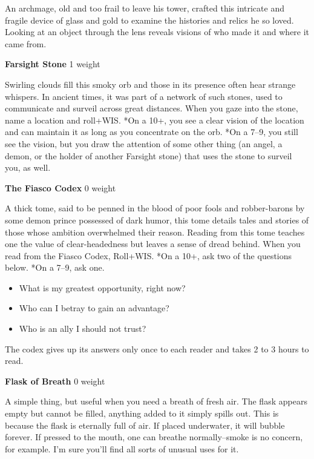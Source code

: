 An archmage, old and too frail to leave his tower, crafted this intricate and fragile device of glass and gold to examine the histories and relics he so loved. Looking at an object through the lens reveals visions of who made it and where it came from.

{\noindent \bfseries Farsight Stone} \hspace*{\fill} 1 weight

Swirling clouds fill this smoky orb and those in its presence often hear strange whispers. In ancient times, it was part of a network of such stones, used to communicate and surveil across great distances. When you gaze into the stone, name a location and roll+WIS. *On a 10+, you see a clear vision of the location and can maintain it as long as you concentrate on the orb. *On a 7--9, you still see the vision, but you draw the attention of some other thing (an angel, a demon, or the holder of another Farsight stone) that uses the stone to surveil you, as well.

{\noindent \bfseries The Fiasco Codex} \hspace*{\fill} 0 weight

A thick tome, said to be penned in the blood of poor fools and robber-barons by some demon prince possessed of dark humor, this tome details tales and stories of those whose ambition overwhelmed their reason. Reading from this tome teaches one the value of clear-headedness but leaves a sense of dread behind. When you read from the Fiasco Codex, Roll+WIS. *On a 10+, ask two of the questions below. *On a 7--9, ask one.
\begin{itemize}
\item What is my greatest opportunity, right now?
\item Who can I betray to gain an advantage?
\item Who is an ally I should not trust?

\end{itemize}

The codex gives up its answers only once to each reader and takes 2 to 3 hours to read.

{\noindent \bfseries Flask of Breath} \hspace*{\fill} 0 weight

A simple thing, but useful when you need a breath of fresh air. The flask appears empty but cannot be filled, anything added to it simply spills out. This is because the flask is eternally full of air. If placed underwater, it will bubble forever. If pressed to the mouth, one can breathe normally--smoke is no concern, for example. I'm sure you'll find all sorts of unusual uses for it.

